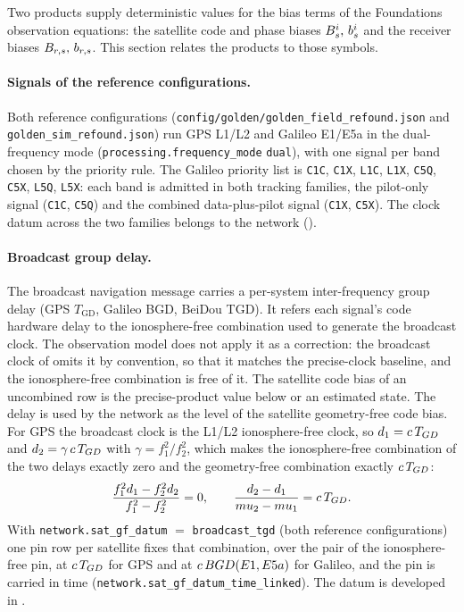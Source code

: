 \documentclass[main.tex]{subfiles}
\begin{document}
Two products supply deterministic values for the bias terms of the
Foundations observation equations: the satellite code and phase biases
$B^i_s,\,b^i_s$ and the receiver biases
$B_{r,s},\,b_{r,s}$.  This section relates the products to
those symbols.

\paragraph{Signals of the reference configurations.}
Both reference configurations
(\texttt{config/golden/golden\_field\_refound.json} and
\texttt{golden\_sim\_refound.json}) run GPS L1/L2 and Galileo E1/E5a in
the dual-frequency mode (\texttt{processing.frequency\_mode} \texttt{dual}),
with one signal per band chosen by the priority rule.  The Galileo priority
list is \texttt{C1C}, \texttt{C1X}, \texttt{L1C}, \texttt{L1X},
\texttt{C5Q}, \texttt{C5X}, \texttt{L5Q}, \texttt{L5X}: each band is admitted
in both tracking families, the pilot-only signal (\texttt{C1C}, \texttt{C5Q})
and the combined data-plus-pilot signal (\texttt{C1X}, \texttt{C5X}).  The
clock datum across the two families belongs to the network
().

\paragraph{Broadcast group delay.}
The broadcast navigation message carries a per-system inter-frequency
group delay (GPS $T_{\mathrm{GD}}$, Galileo BGD, BeiDou TGD).  It refers each
signal's code hardware delay to the ionosphere-free combination used to
generate the broadcast clock.  The observation model does not apply it as
a correction: the broadcast clock of
 omits it by
convention, so that it matches the precise-clock baseline, and the
ionosphere-free combination is free of it.  The satellite code bias of an
uncombined row is the precise-product value below or an estimated state.
The delay is used by the network as the level of the satellite
geometry-free code bias.  For GPS the broadcast clock is the L1/L2
ionosphere-free clock, so $d_1=c\,T_{GD}$ and
$d_2=\gamma\,c\,T_{GD}$ with $\gamma=f_1^2/f_2^2$, which makes
the ionosphere-free combination of the two delays exactly zero and the
geometry-free combination exactly $c\,T_{GD}$:
\begin{equation}
\frac{f_1^{2}d_1-f_2^{2}d_2}{f_1^{2}-f_2^{2}} = 0,
\qquad
\frac{d_2-d_1}{mu_2-mu_1} = c\,T_{GD} .
\label{eq:obsphys-tgd}
\end{equation}
With \texttt{network.sat\_gf\_datum} $=$ \texttt{broadcast\_tgd} (both
reference configurations) one pin row per satellite fixes that
combination, over the pair of the ionosphere-free pin, at
$c\,T_{GD}$ for GPS and at $c\,BGD(E1,E5a)$ for
Galileo, and the pin is carried in time
(\texttt{network.sat\_gf\_datum\_time\_linked}).  The datum is developed in
.
\end{document}

